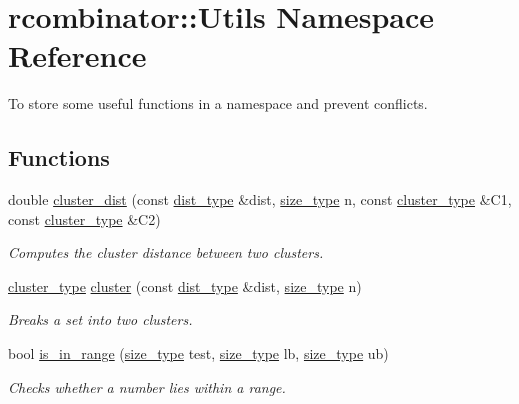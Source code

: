 \hypertarget{namespacercombinator_1_1Utils}{}\section{rcombinator\+:\+:Utils Namespace Reference}
\label{namespacercombinator_1_1Utils}


To store some useful functions in a namespace and prevent conflicts.  


\subsection*{Functions}
\begin{DoxyCompactItemize}
\item 
double \mbox{\hyperlink{namespacercombinator_1_1Utils_a948886c343b7c56fae8e1921dfa5114a}{cluster\+\_\+dist}} (const \mbox{\hyperlink{constants_8h_a0d6ecb761af58b56a675077153fa9ba9}{dist\+\_\+type}} \&dist, \mbox{\hyperlink{constants_8h_abcd18a5521fc90ff6e7b00e4fee98397}{size\+\_\+type}} n, const \mbox{\hyperlink{constants_8h_aa5d5324de5e3188e825da6a7a40df01d}{cluster\+\_\+type}} \&C1, const \mbox{\hyperlink{constants_8h_aa5d5324de5e3188e825da6a7a40df01d}{cluster\+\_\+type}} \&C2)
\begin{DoxyCompactList}\small\item\em Computes the cluster distance between two clusters. \end{DoxyCompactList}\item 
\mbox{\hyperlink{constants_8h_aa5d5324de5e3188e825da6a7a40df01d}{cluster\+\_\+type}} \mbox{\hyperlink{namespacercombinator_1_1Utils_a7dbf5072b1cc3d4756c46b4acdc59de9}{cluster}} (const \mbox{\hyperlink{constants_8h_a0d6ecb761af58b56a675077153fa9ba9}{dist\+\_\+type}} \&dist, \mbox{\hyperlink{constants_8h_abcd18a5521fc90ff6e7b00e4fee98397}{size\+\_\+type}} n)
\begin{DoxyCompactList}\small\item\em Breaks a set into two clusters. \end{DoxyCompactList}\item 
bool \mbox{\hyperlink{namespacercombinator_1_1Utils_a2693553db4ed242f1488e6c9fd491692}{is\+\_\+in\+\_\+range}} (\mbox{\hyperlink{constants_8h_abcd18a5521fc90ff6e7b00e4fee98397}{size\+\_\+type}} test, \mbox{\hyperlink{constants_8h_abcd18a5521fc90ff6e7b00e4fee98397}{size\+\_\+type}} lb, \mbox{\hyperlink{constants_8h_abcd18a5521fc90ff6e7b00e4fee98397}{size\+\_\+type}} ub)
\begin{DoxyCompactList}\small\item\em Checks whether a number lies within a range. \end{DoxyCompactList}\end{DoxyCompactItemize}


